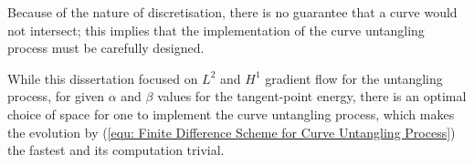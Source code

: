 \documentclass[../dissertation.tex]{subfiles}
\begin{document}
Because of the nature of discretisation, there is no guarantee that a curve would not intersect;
this implies that the implementation of the curve untangling process must be carefully designed.

While this dissertation focused on $L^2$ and $H^1$ gradient flow for the untangling process,
for given $\alpha$ and $\beta$ values for the tangent-point energy,
there is an optimal choice of space for one to implement the curve untangling process,
which makes the evolution by (\ref{equ: Finite Difference Scheme for Curve Untangling Process}) the fastest
and its computation trivial.
\end{document}
